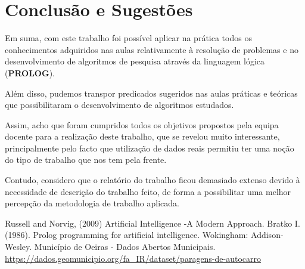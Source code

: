 \documentclass[a4paper,12pt]{report}
\begin{document}
\chapter{Conclusão e Sugestões}

Em suma, com este trabalho foi possível aplicar na prática todos os conhecimentos adquiridos nas aulas relativamente à resolução de problemas e no desenvolvimento de algoritmos de pesquisa através da linguagem lógica (\textbf{PROLOG}).
\par Além disso, pudemos transpor predicados sugeridos nas aulas práticas e teóricas que possibilitaram o desenvolvimento de algoritmos estudados.
\par Assim, acho que foram cumpridos todos os objetivos propostos pela equipa docente para a realização deste trabalho, que se revelou muito interessante, principalmente pelo facto que utilização de dados reais permitiu ter uma noção do tipo de trabalho que nos tem pela frente.
\par Contudo, considero que o relatório do trabalho ficou demasiado extenso devido à necessidade de descrição do trabalho feito, de forma a possibilitar uma melhor percepção da metodologia de trabalho aplicada.







\begin{thebibliography}{}
\bibitem{}
Russell and Norvig, (2009) Artificial Intelligence -A Modern Approach.
\bibitem{}
Bratko I. (1986). Prolog programming for artificial intelligence. Wokingham: Addison-Wesley.
\bibitem{}
Município de Oeiras - Dados Abertos Municipais.     
\url{https://dados.geomunicipio.org/fa_IR/dataset/paragens-de-autocarro}
\end{thebibliography}
\end{document}
